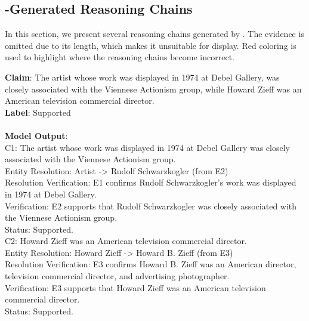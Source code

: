\subsection{\themodel-Generated Reasoning Chains}\label{sec:cases}
In this section, we present several reasoning chains generated by \themodel. The evidence is omitted due to its length, which makes it unsuitable for display. Red coloring is used to highlight where the reasoning chains become incorrect.
\small{\begin{casebox}
\textbf{Claim}: The artist whose work was displayed in 1974 at Debel Gallery, was closely associated with the Viennese Actionism group, while Howard Zieff was an American television commercial director.\\
\textbf{Label}: Supported\\\\
\textbf{Model Output}:\\
C1: The artist whose work was displayed in 1974 at Debel Gallery was closely associated with the Viennese Actionism group.\\Entity Resolution: Artist -> Rudolf Schwarzkogler (from E2)\\Resolution Verification: E1 confirms Rudolf Schwarzkogler's work was displayed in 1974 at Debel Gallery.\\Verification: E2 supports that Rudolf Schwarzkogler was closely associated with the Viennese Actionism group.\\Status: Supported.\vspace{1mm}\\C2: Howard Zieff was an American television commercial director.\\Entity Resolution: Howard Zieff -> Howard B. Zieff (from E3)\\Resolution Verification: E3 confirms Howard B. Zieff was an American director, television commercial director, and advertising photographer.\\Verification: E3 supports that Howard Zieff was an American television commercial director.\\Status: Supported.
\end{casebox}}

